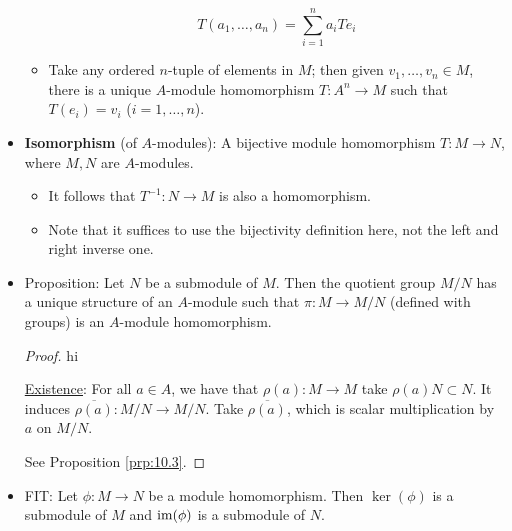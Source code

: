 \documentclass[../notes.tex]{subfiles}
\begin{document}
\begin{itemize}
\begin{itemize}
\begin{equation*}
            T(a_1,\dots,a_n) = \sum_{i=1}^na_iTe_i
        \end{equation*}
        \item Take any ordered $n$-tuple of elements in $M$; then given $v_1,\dots,v_n\in M$, there is a unique $A$-module homomorphism $T:A^n\to M$ such that $T(e_i)=v_i$ ($i=1,\dots,n$).
    \end{itemize}
    \item \textbf{Isomorphism} (of $A$-modules): A bijective module homomorphism $T:M\to N$, where $M,N$ are $A$-modules.
    \begin{itemize}
        \item It follows that $T^{-1}:N\to M$ is also a homomorphism.
        \item Note that it suffices to use the bijectivity definition here, not the left and right inverse one.
    \end{itemize}
    \item Proposition: Let $N$ be a submodule of $M$. Then the quotient group $M/N$ has a unique structure of an $A$-module such that $\pi:M\to M/N$ (defined with groups) is an $A$-module homomorphism.
    \begin{proof}
        {\color{white}hi}\par
        \underline{Existence}: For all $a\in A$, we have that $\rho(a):M\to M$ take $\rho(a)N\subset N$. It induces $\overline{\rho(a)}:M/N\to M/N$. Take $\overline{\rho(a)}$, which is scalar multiplication by $a$ on $M/N$.\par
        See Proposition \ref{prp:10.3}.
    \end{proof}
    \item FIT: Let $\phi:M\to N$ be a module homomorphism. Then $\ker(\phi)$ is a submodule of $M$ and $\operatorname{im}(\phi)$ is a submodule of $N$.
    \begin{figure}[H]
        \centering
\end{figure}
\end{itemize}
\end{document}
